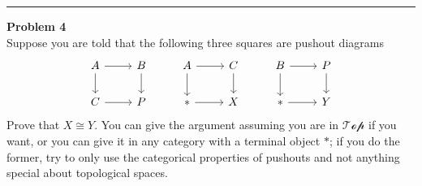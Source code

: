 \documentclass[a4paper, 12pt]{article}
\newenvironment{problem}[2][Problem]
    { \begin{mdframed}[backgroundcolor=gray!20] \textbf{#1 #2} \\}
    {  \end{mdframed}}
\begin{document}
\noindent\rule{7in}{2.8pt}
\begin{problem}{4}
Suppose you are told that the following three squares are pushout diagrams 
\[\begin{tikzcd}
	A & B & A & C & B & P \\
	C & P & {*} & X & {*} & Y
	\arrow[from=1-1, to=1-2]
	\arrow[from=1-1, to=2-1]
	\arrow[from=1-2, to=2-2]
	\arrow[from=1-3, to=1-4]
	\arrow[from=1-3, to=2-3]
	\arrow[from=1-4, to=2-4]
	\arrow[from=1-5, to=1-6]
	\arrow[from=1-5, to=2-5]
	\arrow[from=1-6, to=2-6]
	\arrow[from=2-1, to=2-2]
	\arrow[from=2-3, to=2-4]
	\arrow[from=2-5, to=2-6]
\end{tikzcd}\]
Prove that \(X\cong Y\). You can give the argument assuming you are in \(\mathcal{Top}\) if you want, or you can give it in any category with a terminal object \(*\); if you do the former, try to only use the categorical properties 
of pushouts and not anything special about topological spaces.
\end{problem}
\end{document}
